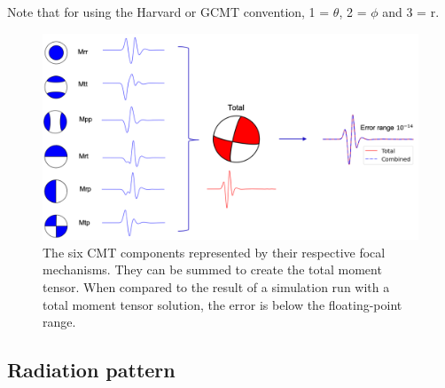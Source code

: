 \documentclass[../Text/00main.tex]{subfiles}
\begin{document}
Note that for using the Harvard or GCMT convention, 1 = $\theta$, 2 = $\phi$ and 3 = r. 

\begin{figure}
    \centering
    \includegraphics[width=.85\textwidth]{images_methods/cmtcombi_informationfigure.png}
    \caption{The six CMT components represented by their respective focal mechanisms. They can be summed to create the total moment tensor. When compared to the result of a simulation run with a total moment tensor solution, the error is below the floating-point range.}
    \label{fig:cmtseparatecombine}
\end{figure}


\subsection{Radiation pattern}
\end{document}
